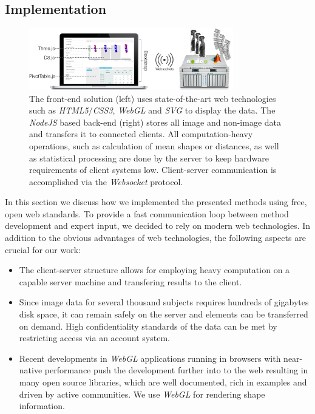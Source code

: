 \documentclass[journal]{style/vgtc} 			          %
\begin{document}
\subsection{Implementation}
\begin{figure}[htb]
 \centering
 \label{fig:technologies}
 \includegraphics[width=3.5in]{figures/technologies}
 \caption{The front-end solution (left) uses state-of-the-art web technologies such as \emph{HTML5}/\emph{CSS3}, \emph{WebGL} and \emph{SVG} to display the data.
 The \emph{NodeJS} based back-end (right) stores all image and non-image data and transfers it to connected clients.
 All computation-heavy operations, such as calculation of mean shapes or distances, as well as statistical processing are done by the server to keep hardware requirements of client systems low. 
 Client-server communication is accomplished via the \emph{Websocket} protocol.
 }
\end{figure}
In this section we discuss how we implemented the presented methods using free, open web standards.
%
To provide a fast communication loop between method development and expert input, we decided to rely on modern web technologies.
%
In addition to the obvious advantages of web technologies, the following aspects are crucial for our work:
\begin{itemize}
	\item The client-server structure allows for employing heavy computation on a capable server machine and transfering results to the client.
	\item Since image data for several thousand subjects requires hundreds of gigabytes disk space, it can remain safely on the server and elements can be transferred on demand.
	High confidentiality standards of the data can be met by restricting access via an account system.
	\item Recent developments in \emph{WebGL} applications running in browsers with near-native performance push the development further into to the web resulting in many open source libraries, which are well documented, rich in examples and driven by active communities. We use \emph{WebGL} for rendering shape information.
\end{itemize}
\end{document}
